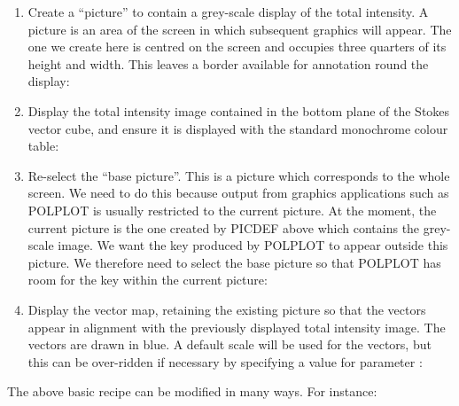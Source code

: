 \documentclass[twoside,11pt]{starlink}
\begin{document}
\begin{enumerate}
\item \label{STEP:PICDEF} Create a ``picture'' to contain a grey-scale display of the total
intensity. A picture is an area of the screen in which subsequent graphics
will appear. The one we create here is centred on the screen and occupies
three quarters of its height and width. This leaves a border available
for annotation round the display:
\begin{terminalv}
\end{terminalv}

\item \label{STEP:DISPLAY} Display the total intensity image contained in the bottom plane of
the Stokes vector cube, and ensure it is displayed with the standard
monochrome colour table:
\begin{terminalv}
\end{terminalv}

\item \label{STEP:PICLIST} Re-select the ``base picture''. This is a
picture which corresponds to the whole screen. We need to do this because
output from graphics applications such as POLPLOT is usually restricted
to the current picture. At the moment, the current picture is the one
created by PICDEF above which contains the grey-scale image. We want the
key produced by POLPLOT to appear outside this picture. We therefore need
to select the base picture so that POLPLOT has room for the key within
the current picture:
\begin{terminalv}
\end{terminalv}

\item \label{STEP:POLPLOT} Display the vector map, retaining the existing picture so that the
vectors appear in alignment with the previously displayed total intensity
image. The vectors are drawn in blue. A default scale will be used for the
vectors, but this can be over-ridden if necessary by specifying a value for
parameter :
\begin{terminalv}
\end{terminalv}

\end{enumerate}

The above basic recipe can be modified in many ways. For instance:
\end{document}
